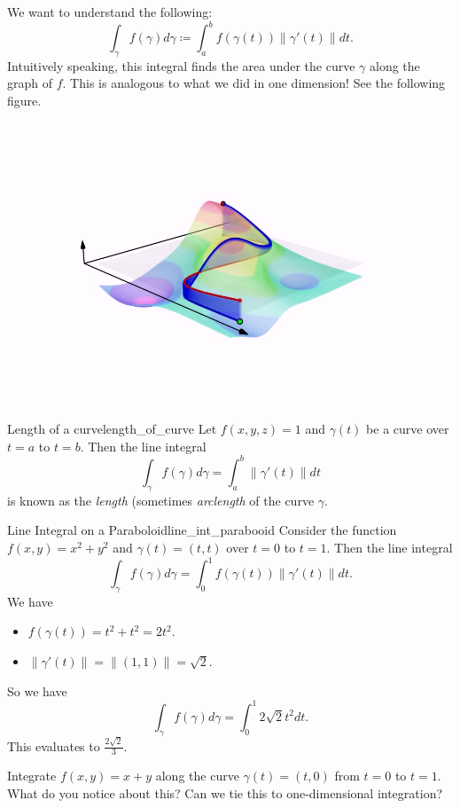         We want to understand the following:
        \[
        \int_\gamma f(\gamma)d\gamma \coloneqq \int_a^b f(\gamma(t))\|\gamma'(t)\|dt.
        \]
        Intuitively speaking, this integral finds the area under the curve $\gamma$ along the graph of $f$.  This is analogous to what we did in one dimension! See the following figure.
        \begin{figure}[H]
            \centering
            \includegraphics[width=.5\textwidth]{Figures/Line_integral_of_scalar_field.jpg}
        \end{figure}
        
        \begin{ex}{Length of a curve}{length_of_curve}
        Let $f(x,y,z)=1$ and $\gamma(t)$ be a curve over $t=a$ to $t=b$.  Then the line integral
        \[
        \int_\gamma f(\gamma)d\gamma = \int_a^b \|\gamma'(t)\|dt
        \]
        is known as the \emph{length} (sometimes \emph{arclength} of the curve $\gamma$.
        \end{ex}
        
        \begin{ex}{Line Integral on a Paraboloid}{line_int_parabooid}
        Consider the function $f(x,y)=x^2+y^2$ and $\gamma(t)=(t,t)$ over $t=0$ to $t=1$.  Then the line integral
        \[
        \int_\gamma f(\gamma)d\gamma = \int_0^1 f(\gamma(t))\|\gamma'(t)\|dt.
        \]
        We have
        \begin{itemize}
            \item $f(\gamma(t))=t^2+t^2=2t^2.$
            \item $\|\gamma'(t)\|=\|(1,1)\|=\sqrt{2}.$
        \end{itemize}
        So we have
        \[
        \int_\gamma f(\gamma)d\gamma = \int_0^1 2\sqrt{2}t^2dt.
        \]
        This evaluates to $\frac{2\sqrt{2}}{3}$.
        \end{ex}
        
        \begin{exercise}
        Integrate $f(x,y)=x+y$ along the curve $\gamma(t)=(t,0)$ from $t=0$ to $t=1$. What do you notice about this? Can we tie this to one-dimensional integration?
        \end{exercise}
        
